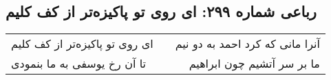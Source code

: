 \begin{center}
\section*{رباعی شماره ۲۹۹: ای روی تو پاکیزه‌تر از کف کلیم}
\label{sec:sh299}
\begin{longtable}{l p{0.5cm} r}
ای روی تو پاکیزه‌تر از کف کلیم
&&
آنرا مانی که کرد احمد به دو نیم
\\
تا آن رخ یوسفی به ما بنمودی
&&
ما بر سر آتشیم چون ابراهیم
\\
\end{longtable}
\end{center}
